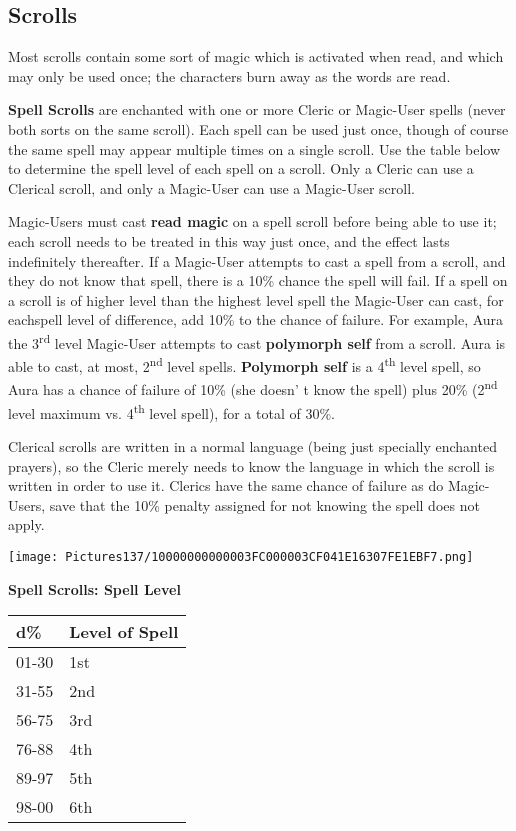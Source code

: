 \documentclass[a4paper,twoside,openany,10pt]{book}
\begin{document}
\begin{multicols}{2}
\subsection{Scrolls}\label{scrolls-1}

Most scrolls contain some sort of magic which is activated when read, and which may only be used once; the characters burn away as the words are read.

\textbf{Spell Scrolls} are enchanted with one or more Cleric or Magic-User spells (never both sorts on the same scroll). Each spell can be used just once, though of course the same spell may appear multiple times on a single scroll. Use the table below to determine the spell level of each spell on a scroll. Only a Cleric can use a Clerical scroll, and only a Magic-User can use a Magic-User scroll.

Magic-Users must cast \textbf{read magic} on a spell scroll before being able to use it; each scroll needs to be treated in this way just once, and the effect lasts indefinitely thereafter. If a Magic-User attempts to cast a spell from a scroll, and they do not know that spell, there is a 10\% chance the spell will fail. If a spell on a scroll is of higher level than the highest level spell the Magic-User can cast, for eachspell level of difference, add 10\% to the chance of failure. For example, Aura the 3\textsuperscript{rd} level Magic-User attempts to cast \textbf{polymorph self} from a scroll. Aura is able to cast, at most, 2\textsuperscript{nd} level spells. \textbf{Polymorph self} is a 4\textsuperscript{th} level spell, so Aura has a chance of failure of 10\% (she doesn' t know the spell) plus 20\% (2\textsuperscript{nd} level maximum vs. 4\textsuperscript{th} level spell), for a total of 30\%.

Clerical scrolls are written in a normal language (being just specially enchanted prayers), so the Cleric merely needs to know the language in which the scroll is written in order to use it. Clerics have the same chance of failure as do Magic-Users, save that the 10\% penalty assigned for not knowing the spell does not apply.

\begin{flushleft} \texttt{[image: Pictures137/10000000000003FC000003CF041E16307FE1EBF7.png]}  \end{flushleft}


\textbf{Spell Scrolls: Spell Level}

\begin{tabular*}{0.93\linewidth}{@{\extracolsep{\fill}}ll}
\textbf{d\%} & \textbf{Level of Spell} \\\toprule
01-30 & 1st \\\hline
31-55 & 2nd \\\hline
56-75 & 3rd \\\hline
76-88 & 4th \\\hline
89-97 & 5th \\\hline
98-00 & 6th \\\bottomrule
\end{tabular*}\medskip


\end{multicols}
\end{document}
